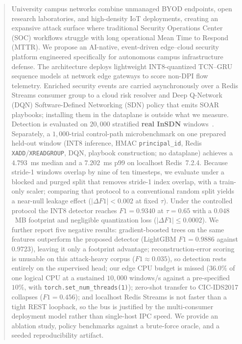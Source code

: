 \documentclass[conference,a4paper]{IEEEtran}
\begin{document}
\begin{abstract}
University campus networks combine unmanaged BYOD endpoints, open research laboratories, and high-density IoT deployments, creating an expansive attack surface where traditional Security Operations Center (SOC) workflows struggle with long operational Mean Time to Respond (MTTR). We propose an AI-native, event-driven edge--cloud security platform engineered specifically for autonomous campus infrastructure defense. The architecture deploys lightweight INT8-quantized TCN--GRU sequence models at network edge gateways to score non-DPI flow telemetry. Enriched security events are carried asynchronously over a Redis Streams consumer group to a cloud risk resolver and Deep Q-Network (DQN) Software-Defined Networking (SDN) policy that emits SOAR playbooks; installing them in the dataplane is outside what we measure. Detection is evaluated on $20{,}000$ stratified \textbf{real InSDN} windows~\cite{b1}. Separately, a $1{,}000$-trial control-path microbenchmark on one prepared held-out window (INT8 inference, HMAC \texttt{principal\_id}, Redis \texttt{XADD}/\texttt{XREADGROUP}, DQN, playbook construction; no dataplane) achieves a $4.793$~ms median and a $7.202$~ms p99 on localhost Redis~7.2.4. Because stride-1 windows overlap by nine of ten timesteps, we evaluate under a blocked and purged split that removes stride-1 index overlap, with a train-only scaler; comparing that protocol to a conventional random split yields a near-null leakage effect ($|\Delta F1| < 0.002$ at fixed $\tau$). Under the controlled protocol the INT8 detector reaches $F1 = 0.9340$ at $\tau = 0.65$ with a $0.048$~MB footprint and negligible quantization loss ($|\Delta F1| \le 0.0002$). We further report five negative results: gradient-boosted trees on the same features outperform the proposed detector (LightGBM $F1 = 0.9886$ against $0.9723$), leaving it only a footprint advantage; reconstruction-error scoring is unusable on this attack-heavy corpus ($F1 \approx 0.035$), so detection rests entirely on the supervised head; our edge CPU budget is missed ($36.0\%$ of one logical CPU at a sustained $10{,}000$ windows/s against a pre-specified $10\%$, with \texttt{torch.set\_num\_threads(1)}); zero-shot transfer to CIC-IDS2017 collapses ($F1 = 0.456$); and localhost Redis Streams is not faster than a tight REST loopback, so the bus is justified by the multi-consumer deployment model rather than single-host IPC speed. We provide an ablation study, policy benchmarks against a brute-force oracle, and a seeded reproducibility artifact.
\end{abstract}
\end{document}
